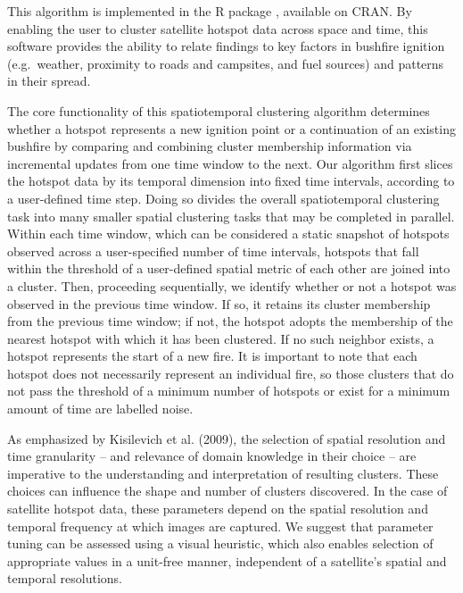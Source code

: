 \noindent This algorithm is implemented in the R package , available on CRAN. By enabling the user to cluster satellite hotspot data across space and time, this software provides the ability to relate findings to key factors in bushfire ignition (e.g.~weather, proximity to roads and campsites, and fuel sources) and patterns in their spread.

The core functionality of this spatiotemporal clustering algorithm determines whether a hotspot represents a new ignition point or a continuation of an existing bushfire by comparing and combining cluster membership information via incremental updates from one time window to the next. Our algorithm first slices the hotspot data by its temporal dimension into fixed time intervals, according to a user-defined time step. Doing so divides the overall spatiotemporal clustering task into many smaller spatial clustering tasks that may be completed in parallel. Within each time window, which can be considered a static snapshot of hotspots observed across a user-specified number of time intervals, hotspots that fall within the threshold of a user-defined spatial metric of each other are joined into a cluster. Then, proceeding sequentially, we identify whether or not a hotspot was observed in the previous time window. If so, it retains its cluster membership from the previous time window; if not, the hotspot adopts the membership of the nearest hotspot with which it has been clustered. If no such neighbor exists, a hotspot represents the start of a new fire. It is important to note that each hotspot does not necessarily represent an individual fire, so those clusters that do not pass the threshold of a minimum number of hotspots or exist for a minimum amount of time are labelled noise.

As emphasized by Kisilevich et al. (2009), the selection of spatial resolution and time granularity -- and relevance of domain knowledge in their choice -- are imperative to the understanding and interpretation of resulting clusters. These choices can influence the shape and number of clusters discovered. In the case of satellite hotspot data, these parameters depend on the spatial resolution and temporal frequency at which images are captured. We suggest that parameter tuning can be assessed using a visual heuristic, which also enables selection of appropriate values in a unit-free manner, independent of a satellite's spatial and temporal resolutions.

